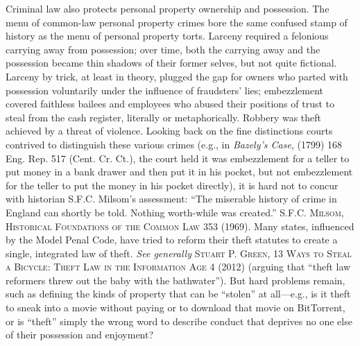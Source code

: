 Criminal law also protects personal property ownership and possession. The menu
of common-law personal property crimes bore the same confused stamp of history
as the menu of personal property torts. Larceny required a felonious carrying
away from possession; over time, both the carrying away and the possession
became thin shadows of their former selves, but not quite fictional. Larceny by
trick, at least in theory, plugged the gap for owners who parted with
possession voluntarily under the influence of fraudsters' lies; embezzlement
covered faithless bailees and employees who abused their positions of trust to
steal from the cash register, literally or metaphorically. Robbery was theft
achieved by a threat of violence. Looking back on the fine distinctions courts
contrived to distinguish these various crimes (e.g., in \textit{Bazely's Case},
(1799) 168 Eng. Rep. 517 (Cent. Cr. Ct.), the court held it was embezzlement
for a teller to put money in a bank drawer and then put it in his pocket, but
not embezzlement for the teller to put the money in his pocket directly), it is
hard not to concur with historian S.F.C. Milsom's assessment: ``The miserable
history of crime in England can shortly be told. Nothing worth-while was
created.''  \textsc{S.F.C. Milsom, Historical Foundations of the
Common Law 353} (1969). Many states, influenced by the Model Penal Code, have
tried to reform their theft statutes to create a single, integrated law of
theft. \textit{See generally} \textsc{Stuart P. Green, 13 Ways to Steal a
Bicycle: Theft Law in the Information Age} 4 (2012) (arguing that ``theft law
reformers threw out the baby with the bathwater''). But hard problems remain,
such as defining the kinds of property that can be ``stolen'' at all---e.g.,
is it theft to sneak into a movie without paying or to download that movie on
BitTorrent, or is ``theft'' simply the wrong word to describe conduct that
deprives no one else of their possession and enjoyment?

